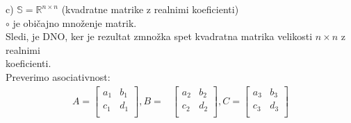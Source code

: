 \documentclass[12pt]{article}
\begin{document}
\noindent
c) $\mathbb{S} = \mathbb{R}^{n \times n}$ (kvadratne matrike z realnimi koeficienti) \\
\hspace*{1em} $\circ$ je običajno množenje matrik. \\
\hspace*{1em} Sledi, je DNO, ker je rezultat zmnožka spet kvadratna matrika velikosti $n \times n$ z realnimi \\
\hspace*{1em} koeficienti. \\
\hspace*{1em} Preverimo asociativnost: \\
\begin{align*}
    A = 
    \begin{bmatrix}
        a_1 & b_1 \\
        c_1 & d_1 \\
    \end{bmatrix}, 
    B = &
    \begin{bmatrix}
        a_2 & b_2 \\
        c_2 & d_2 \\
    \end{bmatrix},
    C = 
    \begin{bmatrix}
        a_3 & b_3 \\
        c_3 & d_3 \\
    \end{bmatrix} \\
\end{align*}
\end{document}
